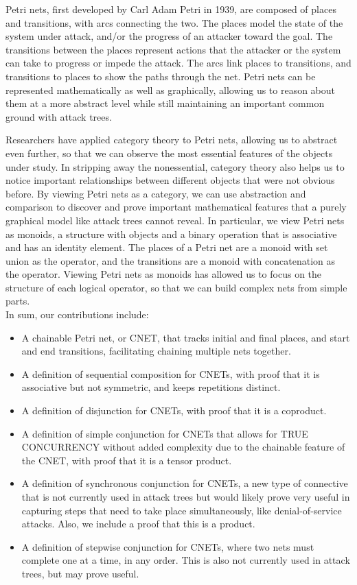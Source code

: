 \par Petri nets, first developed by Carl Adam Petri in 1939, are composed of places and transitions, with arcs connecting the two. The places model the state of the system under attack, and/or the progress of an attacker toward the goal. The transitions between the places represent actions that the attacker or the system can take to progress or impede the attack. The arcs link places to transitions, and transitions to places to show the paths through the net. Petri nets can be represented mathematically as well as graphically, allowing us to reason about them at a more abstract level while still maintaining an important common ground with attack trees. 
\par Researchers have applied category theory to Petri nets, allowing us to abstract even further, so that we can observe the most essential features of the objects under study. In stripping away the nonessential, category theory also helps us to notice important relationships between different objects that were not obvious before. By viewing Petri nets as a category, we can use abstraction and comparison to discover and prove important mathematical features that a purely graphical model like attack trees cannot reveal. In particular, we view Petri nets as monoids, a structure with objects and a binary operation that is associative and has an identity element. The places of a Petri net are a monoid with set union as the operator, and the transitions are a monoid with concatenation as the operator. Viewing Petri nets as monoids has allowed us to focus on the structure of each logical operator, so that we can build complex nets from simple parts.   
\\
In sum, our contributions include:
\begin{itemize}
  \item A chainable Petri net, or CNET, that tracks initial and final places, and start and end transitions, facilitating chaining multiple nets together.
  \item A definition of sequential composition for CNETs, with proof that it is associative but not symmetric, and keeps repetitions distinct.
  \item A definition of disjunction for CNETs, with proof that it is a coproduct. 
  \item A definition of simple conjunction for CNETs that allows for TRUE CONCURRENCY without added complexity due to the chainable feature of the CNET, with proof that it is a tensor product.
  \item A definition of synchronous conjunction for CNETs, a new type of connective that is not currently used in attack trees but would likely prove very useful in capturing steps that need to take place simultaneously, like denial-of-service attacks. Also, we include a proof that this is a product.
  \item A definition of stepwise conjunction for CNETs, where two nets must complete one at a time, in any order. This is also not currently used in attack trees, but may prove useful.
\end{itemize}
